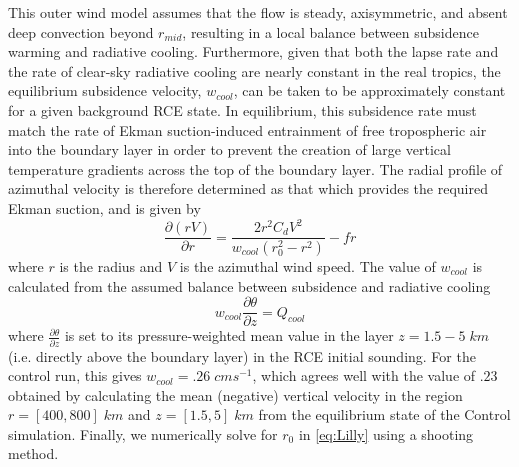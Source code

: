 \documentclass[12pt]{article}
\begin{document}
This outer wind model assumes that the flow is steady, axisymmetric, and absent deep convection beyond $r_{mid}$, resulting in a local balance between subsidence warming and radiative cooling. Furthermore, given that both the lapse rate and the rate of clear-sky radiative cooling are nearly constant in the real tropics, the equilibrium subsidence velocity, $w_{cool}$, can be taken to be approximately constant for a given background RCE state. In equilibrium, this subsidence rate must match the rate of Ekman suction-induced entrainment of free tropospheric air into the boundary layer in order to prevent the creation of large vertical temperature gradients across the top of the boundary layer. The radial profile of azimuthal velocity is therefore determined as that which provides the required Ekman suction, and is given by
\begin{equation}
    \label{eq:Lilly}
    \frac{\partial (rV)}{\partial r}=\frac{2r^2C_dV^2}{w_{cool}(r_0^2-r^2)}-fr
\end{equation}
where $r$ is the radius and $V$ is the azimuthal wind speed. The value of $w_{cool}$ is calculated from the assumed balance between subsidence and radiative cooling
\begin{equation}
    \label{eq:radsub}
    w_{cool} \frac{\partial \theta}{\partial z}=Q_{cool}
\end{equation}
where $\frac{\partial \theta}{\partial z}$ is set to its pressure-weighted mean value in the layer $z=1.5-5 \; km$ (i.e. directly above the boundary layer) in the RCE initial sounding. For the control run, this gives $w_{cool} = .26 \; cm s^{-1}$, which agrees well with the value of $.23$ obtained by calculating the mean (negative) vertical velocity in the region $r = [400, 800] \; km$ and $z = [1.5, 5] \; km$ from the equilibrium state of the Control simulation.  Finally, we numerically solve for $r_0$ in \eqref{eq:Lilly} using a shooting method.
\end{document}
